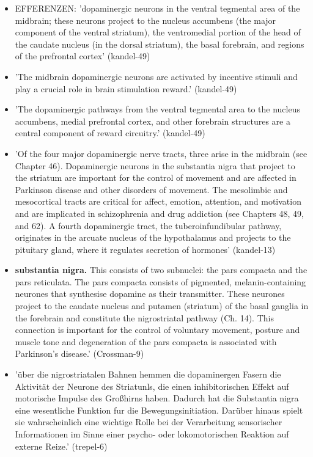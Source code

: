 \documentclass[12pt,a4paper,pdftex]{article}
\begin{document}
\begin{itemize}
    \item EFFERENZEN: 'dopaminergic neurons in the ventral tegmental area of the midbrain; these neurons project to the nucleus accumbens (the major component of the ventral striatum), the ventromedial portion of the head of the caudate nucleus (in the dorsal striatum), the basal forebrain, and regions of the prefrontal cortex' (kandel-49)
    \item 'The midbrain dopaminergic neurons are activated by incentive stimuli and play a crucial role in brain stimulation reward.' (kandel-49)
    \item 'The dopaminergic pathways from the ventral tegmental area to the nucleus accumbens, medial prefrontal cortex, and other forebrain structures are a central component of reward circuitry.' (kandel-49)
    \item 'Of the four major dopaminergic nerve tracts, three arise in the midbrain (see Chapter 46). Dopaminergic neurons in the substantia nigra that project to the striatum are important for the control of movement and are affected in Parkinson disease and other disorders of movement. The mesolimbic and mesocortical tracts are critical for affect, emotion, attention, and motivation and are implicated in schizophrenia and drug addiction (see Chapters 48, 49, and 62). A fourth dopaminergic tract, the tuberoinfundibular pathway, originates in the arcuate nucleus of the hypothalamus and projects to the pituitary gland, where it regulates secretion of hormones' (kandel-13)
    \item \textbf{substantia nigra.} This consists of two subnuclei: the pars compacta and the pars reticulata. The pars compacta consists of pigmented, melanin-containing neurones that synthesise dopamine as their transmitter. These neurones project to the caudate nucleus and putamen (striatum) of the basal ganglia in the forebrain and constitute the nigrostriatal pathway (Ch. 14). This connection is important for the control of voluntary movement, posture and muscle tone and degeneration of the pars compacta is associated with Parkinson’s disease.' (Crossman-9)
    \item 'über die nigrostriatalen Bahnen hemmen die dopaminergen Fasern die Aktivität der Neurone des Striatunls, die einen inhibitorischen Effekt auf motorische Impulse des Großhirns haben. Dadurch hat die Substantia nigra eine wesentliche Funktion fur die Bewegungsinitiation. Darüber hinaus spielt sie wahrscheinlich eine wichtige Rolle bei der Verarbeitung sensorischer Informationen im Sinne einer psycho- oder lokomotorischen Reaktion auf externe Reize.' (trepel-6)

\end{itemize}
\end{document}
